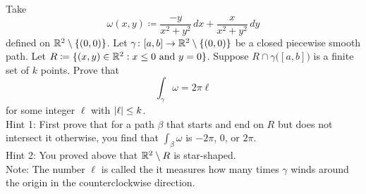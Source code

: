 \begin{exercise}[Hard]
\pagebreak[2]
Take
\begin{equation*}
\omega(x,y) \coloneqq \frac{-y}{x^2+y^2} \, dx + \frac{x}{x^2+y^2} \, dy
\end{equation*}
defined on ${\mathbb{R}}^2 \setminus \{ (0,0) \}$.  Let $\gamma \colon [a,b] \to {\mathbb{R}}^2
\setminus \{ (0,0) \}$ be a closed piecewise smooth path.
Let $R \coloneqq \{ (x,y) \in {\mathbb{R}}^2 : x \leq 0 \text{ and } y=0 \}$.
Suppose $R \cap \gamma\bigl([a,b]\bigr)$ is a finite set of $k$ points.
Prove that
\begin{equation*}
\int_{\gamma} \omega = 2 \pi \ell 
\end{equation*}
for some integer $\ell$ with $\lvert {\ell} \rvert \leq k$.\\
Hint 1: First prove that for a path $\beta$ that starts and end on $R$ but
does not intersect it otherwise, you find that $\int_{\beta} \omega$
is $-2\pi$, 0, or $2\pi$.
\\
Hint 2: You proved above that ${\mathbb{R}}^2 \setminus R$ is star-shaped.
\\
Note: The number $\ell$ is called the \emph{} it measures how many
times $\gamma$ winds around the origin in the counterclockwise direction.
\end{exercise}
